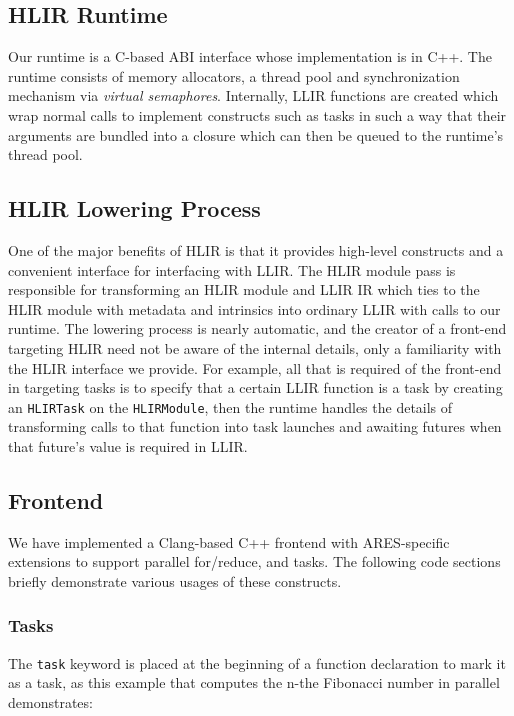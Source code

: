 \documentclass[12pt]{article}
\begin{document}
\subsection{HLIR Runtime}

Our runtime is a C-based ABI interface whose implementation is in C++. The runtime consists of memory allocators, a thread pool and synchronization mechanism via {\it virtual semaphores}. Internally, LLIR functions are created which wrap normal calls to implement constructs such as tasks in such a way that their arguments are bundled into a closure which can then be queued to the runtime's thread pool.

\subsection{HLIR Lowering Process}

One of the major benefits of HLIR is that it provides high-level constructs and a convenient interface for interfacing with LLIR. The HLIR module pass is responsible for transforming an HLIR module and LLIR IR which ties to the HLIR module with metadata and intrinsics into ordinary LLIR with calls to our runtime. The lowering process is nearly automatic, and the creator of a front-end targeting HLIR need not be aware of the internal details, only a familiarity with the HLIR interface we provide.
For example, all that is required of the front-end in targeting tasks is to specify that a certain LLIR function is a task by creating an {\tt HLIRTask} on the {\tt HLIRModule}, then the runtime handles the details of transforming calls to that function into task launches and awaiting futures when that future's value is required in LLIR.

\subsection{Frontend}

We have implemented a Clang-based C++ frontend with ARES-specific extensions to support parallel for/reduce, and tasks. The following code sections briefly demonstrate various usages of these constructs.

\subsubsection{Tasks}

The {\tt task} keyword is placed at the beginning of a function declaration to mark it as a task, as this example that computes the n-the Fibonacci number in parallel demonstrates:
\end{document}
